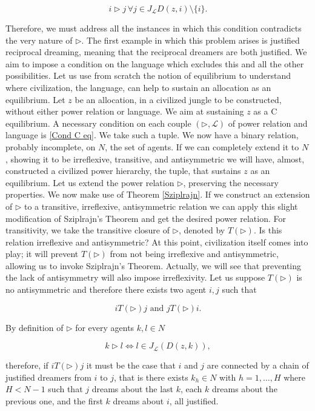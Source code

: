 \begin{equation}\label{Cond C eq}
    i\triangleright j\,\forall j\in J_{\mathcal{L}}D(z,i)\setminus\{i\}.
\end{equation}

Therefore, we must address all the instances in which this condition contradicts the very nature of $\triangleright$. The first example in which this problem arises is justified reciprocal dreaming, meaning that the reciprocal dreamers are both justified. We aim to impose a condition on the language which excludes this and all the other possibilities. Let us use from scratch the notion of equilibrium to understand where civilization, the language, can help to sustain an allocation as an equilibrium. Let $z$ be an allocation, in a civilized jungle to be constructed, without either power relation or language. We aim at sustaining $z$ as a C equilibrium. A necessary condition on each couple $(\triangleright,\mathcal{L})$ of power relation and language is \ref{Cond C eq}. We take such a tuple. We now have a binary relation, probably incomplete, on $N$, the set of agents. If we can completely extend it to $N$, showing it to be irreflexive, transitive, and antisymmetric we will have, almost, constructed a civilized power hierarchy, the tuple, that sustains $z$ as an equilibrium. Let us extend the power relation $\triangleright$, preserving the necessary properties. We now make use of Theorem \ref{Sziplrajn}. If we construct an extension of $\triangleright$ to a transitive, irreflexive, antisymmetric relation we can apply this slight modification of Sziplrajn's Theorem and get the desired power relation. For transitivity, we take the transitive closure of $\triangleright$, denoted by $T(\triangleright)$. Is this relation irreflexive and antisymmetric? At this point, civilization itself comes into play; it will prevent $T(\triangleright)$ from not being irreflexive and antisymmetric, allowing us to invoke Sziplrajn's Theorem. Actually, we will see that preventing the lack of antisymmetry will also impose irreflexivity. Let us suppose $T(\triangleright)$ is no antisymmetric and therefore there exists two agent $i,j$ such that 

\[iT(\triangleright)j \text{ and }jT(\triangleright)i.\]

By definition of $\triangleright$ for every agents $k,l\in N$

\[k\triangleright l \Leftrightarrow l\in J_{\mathcal{L}}(D(z,k)),\]

therefore, if $iT(\triangleright)j$ it must be the case that $i$ and $j$ are connected by a chain of justified dreamers from $i$ to $j$, that is there exists $k_{h}\in N$ with $h=1,\dots,H$ where $H<N-1$ such that $j$ dreams about the last $k$, each $k$ dreams about the previous one, and the first $k$ dreams about $i$, all justified. 

